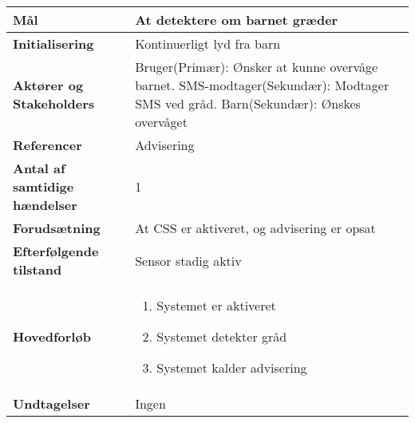 \begin{table}[H] \centering
\begin{tabular}{|p{6cm}|p{8cm}|}
	\hline
		\textbf{Mål} &
			At detektere om barnet græder \\\hline
		\textbf{Initialisering} &
			Kontinuerligt lyd fra barn \\\hline
		\textbf{Aktører og Stakeholders} &
			Bruger(Primær): Ønsker at kunne overvåge barnet. SMS-modtager(Sekundær): Modtager SMS ved gråd. Barn(Sekundær): Ønskes overvåget 						\\\hline
		\textbf{Referencer}						
			&Advisering \\\hline
		\textbf{Antal af samtidige hændelser} &
			1 \\\hline
		\textbf{Forudsætning} & 
			At CSS er aktiveret, og advisering er opsat \\\hline
		\textbf{Efterfølgende tilstand} &
			Sensor stadig aktiv \\\hline
		\textbf{Hovedforløb} &
			\begin{enumerate}
	
				\item Systemet er aktiveret
												
				\item Systemet detekter gråd
												
				\item Systemet kalder advisering
								
			\end{enumerate}\\\hline
			
		\textbf{Undtagelser} &
			Ingen \\\hline
	\end{tabular}
	\label{UC5} 
\end{table}

